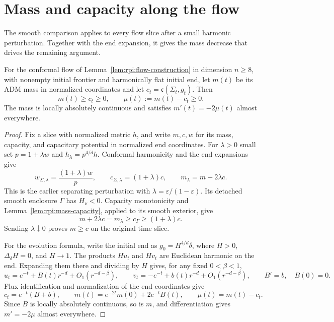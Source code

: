 \section{Mass and capacity along the flow}
\label{sec:rpi:flow-mass-capacity}

The smooth comparison applies to every flow slice after a small
harmonic perturbation. Together with the end expansion, it gives the
mass decrease that drives the remaining argument.

\begin{proposition}
\label{prop:rpi:mass-evolution}
For the conformal flow of Lemma~\ref{lem:rpi:flow-construction} in
dimension $n\ge8$, with nonempty initial frontier and harmonically flat
initial end, let $m(t)$
be its ADM mass in normalized coordinates and let
$c_t=\mathfrak c(\Sigma_t,g_t)$. Then
\[
 m(t)\ge c_t\ge0,\qquad \mu(t):=m(t)-c_t\ge0.
\]
The mass is locally absolutely continuous and satisfies
$m'(t)=-2\mu(t)$ almost everywhere.
\end{proposition}

\begin{proof}
Fix a slice with normalized metric $h$, and write $m,c,w$ for its mass, capacity, and capacitary
potential in normalized end coordinates. For $\lambda>0$ small set
$p=1+\lambda w$ and $h_\lambda=p^{4/d}h$.
Conformal harmonicity and the end expansions give
\[
 w_{\Sigma,\lambda}=\frac{(1+\lambda)w}{p},\qquad
 c_{\Sigma,\lambda}=(1+\lambda)c,\qquad
 m_\lambda=m+2\lambda c.
\]
This is the earlier separating perturbation with
$\lambda=\varepsilon/(1-\varepsilon)$. Its detached smooth enclosure
$\Gamma$ has $H_\nu<0$. Capacity monotonicity and
Lemma~\ref{lem:rpi:mass-capacity}, applied to its smooth exterior, give
\[
 m+2\lambda c=m_\lambda\ge c_\Gamma
       \ge (1+\lambda)c.
\]
Sending $\lambda\downarrow0$ proves $m\ge c$ on the original time
slice.

For the evolution formula, write the initial end as
$g_0=H^{4/d}\delta$, where $H>0$,
$\Delta_\delta H=0$, and $H\to1$. The products $Hu_t$ and $Hv_t$
are Euclidean harmonic on the end. Expanding them there and dividing
by $H$ gives, for any fixed $0<\beta<1$,
\[
 u_t=e^{-t}+B(t)r^{-d}+O_1(r^{-d-\beta}),\qquad
 v_t=-e^{-t}+b(t)r^{-d}+O_1(r^{-d-\beta}),\qquad B'=b,
 \quad B(0)=0.
\]
Flux identification and normalization of the end coordinates give
\[
 c_t=e^{-t}(B+b),\qquad
 m(t)=e^{-2t}m(0)+2e^{-t}B(t),\qquad
 \mu(t)=m(t)-c_t.
\]
Since $B$ is locally absolutely continuous, so is $m$, and
differentiation gives $m'=-2\mu$ almost everywhere.
\end{proof}

